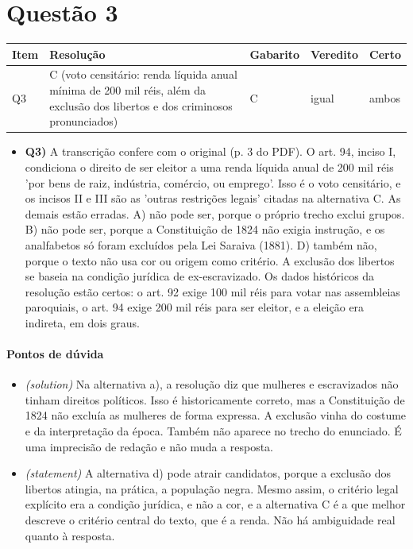 \documentclass{article}%
\begin{document}
\section*{Questão 3}%
\begin{longtable}{@{}p{} p{} p{} p{} p{}@{}}\toprule Item & Resolução & Gabarito & Veredito & Certo \\ \midrule
Q3 & C (voto censitário: renda líquida anual mínima de 200 mil réis, além da exclusão dos libertos e dos criminosos pronunciados) & C & igual & ambos \\
\bottomrule\end{longtable}%
\begin{itemize}%
\item%
\textbf{Q3)} A transcrição confere com o original (p. 3 do PDF). O art. 94, inciso I, condiciona o direito de ser eleitor a uma renda líquida anual de 200 mil réis 'por bens de raiz, indústria, comércio, ou emprego'. Isso é o voto censitário, e os incisos II e III são as 'outras restrições legais' citadas na alternativa C. As demais estão erradas. A) não pode ser, porque o próprio trecho exclui grupos. B) não pode ser, porque a Constituição de 1824 não exigia instrução, e os analfabetos só foram excluídos pela Lei Saraiva (1881). D) também não, porque o texto não usa cor ou origem como critério. A exclusão dos libertos se baseia na condição jurídica de ex{-}escravizado. Os dados históricos da resolução estão certos: o art. 92 exige 100 mil réis para votar nas assembleias paroquiais, o art. 94 exige 200 mil réis para ser eleitor, e a eleição era indireta, em dois graus.%
\end{itemize}%
\paragraph{Pontos de dúvida}%
\begin{itemize}%
\item%
\textit{(solution)} Na alternativa a), a resolução diz que mulheres e escravizados não tinham direitos políticos. Isso é historicamente correto, mas a Constituição de 1824 não excluía as mulheres de forma expressa. A exclusão vinha do costume e da interpretação da época. Também não aparece no trecho do enunciado. É uma imprecisão de redação e não muda a resposta.%
\item%
\textit{(statement)} A alternativa d) pode atrair candidatos, porque a exclusão dos libertos atingia, na prática, a população negra. Mesmo assim, o critério legal explícito era a condição jurídica, e não a cor, e a alternativa C é a que melhor descreve o critério central do texto, que é a renda. Não há ambiguidade real quanto à resposta.%
\end{itemize}%
\end{document}
